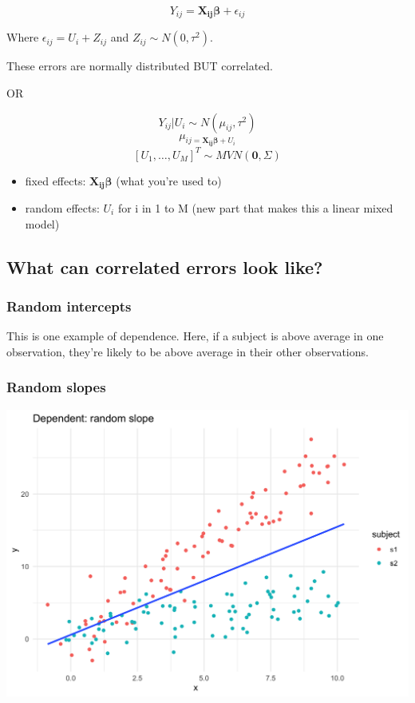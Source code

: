 \documentclass[
  openany]{book}
\providecommand{\tightlist}{%
  \setlength{\itemsep}{0pt}\setlength{\parskip}{0pt}}
\begin{document}
\[Y_{ij} = \boldsymbol{X_{ij}\beta} + \epsilon_{ij}\]

Where \(\epsilon_{ij} = U_i + Z_{ij}\) and \(Z_{ij} \sim N(0, \tau^2)\).

These errors are normally distributed BUT correlated.

OR

\[Y_{ij}|U_i \sim N(\mu_{ij}, \tau^2)\]
\[\mu_{ij{ = \boldsymbol{X_{ij}\beta}+U_i}}\]
\[ [U_1,\ldots,U_M]^T \sim MVN(\boldsymbol0, \Sigma)\]

\begin{itemize}
\tightlist
\item
  fixed effects: \(\boldsymbol{X_{ij}\beta}\) (what you're used to)
\item
  random effects: \(U_i\) for i in 1 to M (new part that makes this a linear mixed model)
\end{itemize}

\hypertarget{what-can-correlated-errors-look-like}{%
\subsection{What can correlated errors look like?}\label{what-can-correlated-errors-look-like}}

\hypertarget{random-intercepts}{%
\subsubsection{Random intercepts}\label{random-intercepts}}

This is one example of dependence. Here, if a subject is above average in one observation, they're likely to be above average in their other observations.

\hypertarget{random-slopes}{%
\subsubsection{Random slopes}\label{random-slopes}}

\begin{center}\includegraphics[width=1\linewidth]{images/m3/rand_slope} \end{center}
\end{document}
